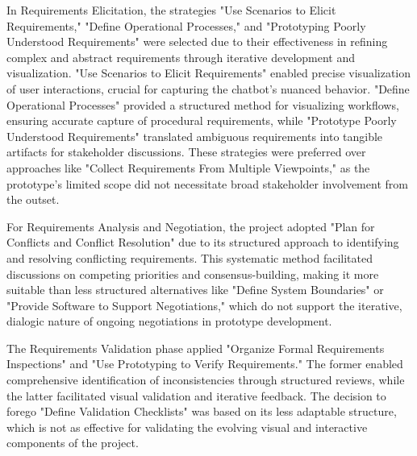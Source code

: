 In Requirements Elicitation, the strategies "Use Scenarios to Elicit Requirements," "Define Operational Processes," and
"Prototyping Poorly Understood Requirements" were selected due to their effectiveness in refining complex and abstract
requirements through iterative development and visualization. "Use Scenarios to Elicit Requirements" enabled precise
visualization of user interactions, crucial for capturing the chatbot’s nuanced behavior.\autocite[cf.][p.99]{sommervilleRequirementsEngineeringGood1997}
"Define Operational Processes" provided a structured method for visualizing workflows, ensuring accurate capture of
procedural requirements, while "Prototype Poorly Understood Requirements" translated ambiguous requirements into
tangible artifacts for stakeholder discussions.\autocite[cf.][p.102--103]{sommervilleRequirementsEngineeringGood1997}
\autocite[cf.][p.94--96]{sommervilleRequirementsEngineeringGood1997} These strategies were preferred over approaches
like "Collect Requirements From Multiple Viewpoints," as the prototype’s limited scope did not necessitate broad
stakeholder involvement from the outset.\autocite[cf.][p.90]{sommervilleRequirementsEngineeringGood1997}

For Requirements Analysis and Negotiation, the project adopted "Plan for Conflicts and Conflict Resolution" due to its
structured approach to identifying and resolving conflicting requirements.\autocite[cf.][p.125--127]{sommervilleRequirementsEngineeringGood1997} This systematic method facilitated
discussions on competing priorities and consensus-building, making it more suitable than less structured alternatives
like "Define System Boundaries" or "Provide Software to Support Negotiations," which do not support the iterative,
dialogic nature of ongoing negotiations in prototype development.\autocite[cf.][p.114]{sommervilleRequirementsEngineeringGood1997}
\autocite[cf.][p.121]{sommervilleRequirementsEngineeringGood1997}

The Requirements Validation phase applied "Organize Formal Requirements Inspections" and "Use Prototyping to Verify
Requirements." The former enabled comprehensive identification of inconsistencies through structured reviews, while the
latter facilitated visual validation and iterative feedback.\autocite[cf.][p.195--196]{sommervilleRequirementsEngineeringGood1997}
\autocite[cf.][p.203--204]{sommervilleRequirementsEngineeringGood1997}The decision to forego "Define Validation Checklists" was
based on its less adaptable structure, which is not as effective for validating the evolving visual and interactive
components of the project.\autocite[cf.][p.200]{sommervilleRequirementsEngineeringGood1997}

